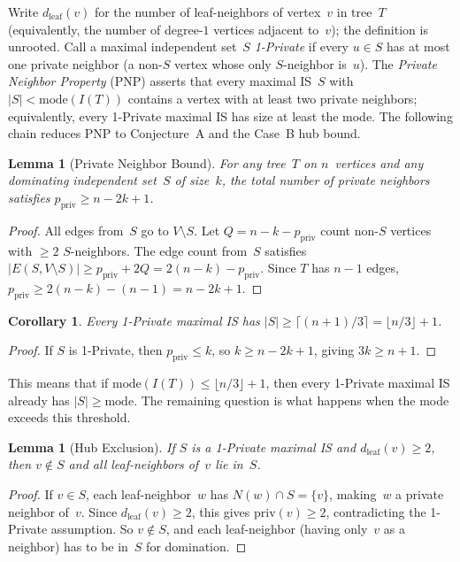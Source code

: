 \documentclass[12pt,oneside]{article}
\newtheorem{lemma}[theorem]{Lemma}
\newtheorem{corollary}[theorem]{Corollary}
\theoremstyle{remark}
\newcommand{\dleaf}{d_{\mathrm{leaf}}}    %
\newcommand{\priv}{\mathrm{priv}}         %
\begin{document}
Write $\dleaf(v)$ for the number of leaf-neighbors of vertex~$v$ in tree~$T$ (equivalently, the number of degree-$1$ vertices adjacent to~$v$); the definition is unrooted.
Call a maximal independent set~$S$ \emph{1-Private} if every $u \in S$ has at most one private neighbor (a non-$S$ vertex whose only $S$-neighbor is~$u$).
The \emph{Private Neighbor Property} (PNP) asserts that every maximal IS~$S$ with $|S|<\mathrm{mode}(I(T))$ contains a vertex with at least two private neighbors; equivalently, every 1-Private maximal IS has size at least the mode.
The following chain reduces PNP to Conjecture~A and the Case~B hub bound.

\begin{lemma}[Private Neighbor Bound]\label{lem:pnb}
  For any tree~$T$ on $n$~vertices and any dominating independent set~$S$ of size~$k$, the total number of private neighbors satisfies $p_{\mathrm{priv}} \ge n - 2k + 1$.
\end{lemma}

\begin{proof}
All edges from~$S$ go to $V \setminus S$.
Let $Q = n - k - p_{\mathrm{priv}}$ count non-$S$ vertices with $\ge 2$ $S$-neighbors.
The edge count from~$S$ satisfies $|E(S, V \setminus S)| \ge p_{\mathrm{priv}} + 2Q = 2(n - k) - p_{\mathrm{priv}}$.
Since $T$ has $n - 1$ edges, $p_{\mathrm{priv}} \ge 2(n - k) - (n - 1) = n - 2k + 1$.
\end{proof}

\begin{corollary}\label{cor:1priv-size}
  Every 1-Private maximal IS has $|S| \ge \lceil(n{+}1)/3\rceil = \lfloor n/3 \rfloor + 1$.
\end{corollary}

\begin{proof}
If $S$ is 1-Private, then $p_{\mathrm{priv}} \le k$, so $k \ge n - 2k + 1$, giving $3k \ge n + 1$.
\end{proof}

This means that if $\mathrm{mode}(I(T)) \le \lfloor n/3 \rfloor + 1$, then every 1-Private maximal IS already has $|S| \ge \mathrm{mode}$.
The remaining question is what happens when the mode exceeds this threshold.

\begin{lemma}[Hub Exclusion]\label{lem:hub}
  If $S$ is a 1-Private maximal IS and $\dleaf(v) \ge 2$, then $v \notin S$ and all leaf-neighbors of~$v$ lie in~$S$.
\end{lemma}

\begin{proof}
If $v \in S$, each leaf-neighbor~$w$ has $N(w) \cap S = \{v\}$, making~$w$ a private neighbor of~$v$.
Since $\dleaf(v) \ge 2$, this gives $\priv(v) \ge 2$, contradicting the 1-Private assumption.
So $v \notin S$, and each leaf-neighbor (having only~$v$ as a neighbor) has to be in~$S$ for domination.
\end{proof}
\end{document}
